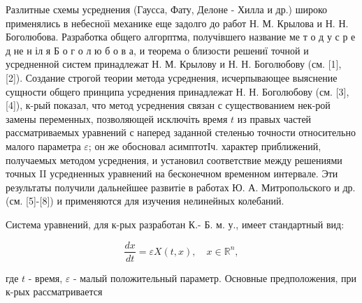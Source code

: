 \documentclass[10pt]{article}
\begin{document}
Разлитные схемы усреднения (Гаусса, Фату, Делоне - Хилла и др.) широко применялись в небесноїі механике еще задолго до работ Н. М. Крылова и Н. Н. Боголюбова. Разработка общего алгорптма, получівшего название ме т о д у с р е д не н іл я Б о г о л ю б о в а, и теорема о близости решениї точной и усредненной систем принадлежат Н. М. Крылову и Н. Н. Боголюбову (см. [1], [2]). Создание строгой теории метода усреднения, исчерпывающее выяснение сущности общего принципа усреднения принадлежат Н. Н. Боголюбову (см. [3], [4]), к-рый показал, что метод усреднения связан с существованием нек-рой замены переменных, позволяющей исключіть время $t$ из правых частей рассматриваемых уравнений с наперед заданной стеленью точности относительно малого параметра $\varepsilon$; он же обосновал асимптотІч. характер приближений, получаемых методом усреднения, и установил соответствие между решениями точных II усредненных уравнений на бесконечном временном интервале. Эти результаты получили дальнейшее развитіе в работах Ю. А. Митропольского и др. (см. [5]-[8]) и применяются для изучения нелинейных колебаний.



Система уравнений, для к-рых разработан К.- Б. м. у., имеет стандартный вид:



\[

\frac{d x}{d t}=\varepsilon X(t, x), \quad x \in \mathbb{R}^{n},

\]



где $t$ - время, $\varepsilon$ - малый положительный параметр. Основные предположения, при к-рых рассматривается
\end{document}
